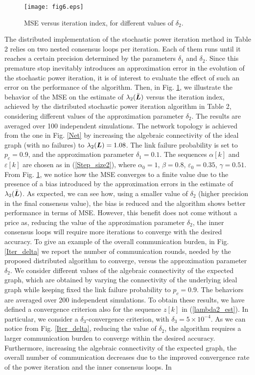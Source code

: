 \documentclass[10pt,twocolumn]{IEEEtran}
\def\bL{\mbox{\boldmath $L$}}
\begin{document}
\begin{figure}[t]
\centering
\texttt{[image: fig6.eps]}
  \caption{MSE versus iteration index, for different values of $\delta_2$.}\label{MSE_delta}
\end{figure}

 The distributed implementation of the stochastic power iteration method in Table 2 relies on two nested consensus loops per iteration. Each of them runs until it reaches a certain precision determined by the parameters $\delta_1$ and $\delta_2$. Since this premature stop inevitably introduces an approximation error in the evolution of the stochastic power iteration, it is of interest to evaluate the effect of such an error on the performance of the algorithm. Then, in Fig. \ref{MSE_delta}, we illustrate the behavior of the MSE on the estimate of $\lambda_2(\bar{\bL})$ versus the iteration index, achieved by the distributed stochastic power iteration algorithm in Table 2, considering different values of the approximation parameter $\delta_2$. The results are averaged over 100 independent simulations. The network topology is achieved from the one in Fig. \ref{Net} by increasing the algebraic connectivity of the ideal graph (with no failures) to $\lambda_2(\bL)=1.08$. The link failure probability is set to $p_c=0.9$, and the approximation parameter $\delta_1=0.1$. The sequences $\alpha[k]$ and $\varepsilon[k]$ are chosen as in (\ref{Step_size2}), where $\alpha_0=1$, $\beta=0.8$, $\varepsilon_0=0.35$, $\gamma=0.51$. From Fig. \ref{MSE_delta}, we notice how the MSE converges to a finite value due to the presence of a bias introduced by the approximation errors in the estimate of $\lambda_2(\bar{\bL})$. As expected, we can see how, using a smaller value of $\delta_2$ (higher precision in the final consensus value), the bias is reduced and the algorithm shows better performance in terms of MSE. However, this benefit does not come without a price as, reducing the value of the approximation parameter $\delta_2$, the inner consensus loops will require more iterations to converge with the desired accuracy. To give an example of the overall communication burden, in Fig. \ref{Iter_delta} we report the number of communication rounds, needed by the proposed distributed algorithm to converge, versus the approximation parameter $\delta_2$. We consider different values of the algebraic connectivity of the expected graph, which are obtained by varying the connectivity of the underlying ideal graph while keeping fixed the link failure probability to $p_c=0.9$. The behaviors are averaged over 200 independent simulations. To obtain these results, we have defined a convergence criterion also for the sequence $z[k]$ in (\ref{lambda2_est}). In particular, we consider a $\delta_3$-convergence criterion, with $\delta_3=5\times 10^{-4}$. As we can notice from Fig. \ref{Iter_delta}, reducing the value of $\delta_2$, the algorithm requires a larger communication burden to converge within the desired accuracy. Furthermore, increasing the algebraic connectivity of the expected graph, the overall number of communication decreases due to the improved convergence rate of the power iteration and the inner consensus loops. In 
\end{document}
